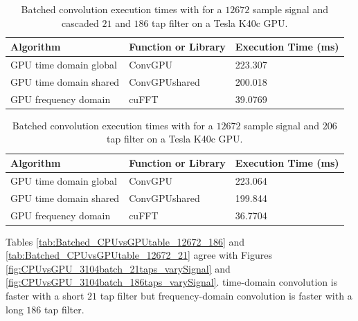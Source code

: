 \begin{table}
\caption{Batched convolution execution times with for a $12672$ sample signal and cascaded $21$ and $186$ tap filter on a Tesla K40c GPU.}
\begin{center}
\begin{tabular}{lll}
	\toprule
	Algorithm 				& Function or Library		& Execution Time (ms) \\ \midrule
	GPU time domain global 	& ConvGPU 					& 223.307		\\
	GPU time domain shared 	& ConvGPUshared 			& 200.018		\\
	GPU frequency domain 	& cuFFT						& 39.0769		\\ 
	\bottomrule
\end{tabular}
\end{center}
\label{tab:Batched_CPUvsGPUtable_12672_21_186}
\end{table}
\begin{table}
\caption{Batched convolution execution times with for a $12672$ sample signal and $206$ tap filter on a Tesla K40c GPU.}
\begin{center}
\begin{tabular}{lll}
	\toprule
	Algorithm 				& Function or Library		& Execution Time (ms) \\ \midrule
	GPU time domain global 	& ConvGPU 					& 223.064		\\
	GPU time domain shared 	& ConvGPUshared 			& 199.844		\\
	GPU frequency domain 	& cuFFT						& 36.7704		\\ 
	\bottomrule
\end{tabular}
\end{center}
\label{tab:Batched_CPUvsGPUtable_12672_206}
\end{table}

Tables \ref{tab:Batched_CPUvsGPUtable_12672_186} and \ref{tab:Batched_CPUvsGPUtable_12672_21} agree with Figures \ref{fig:CPUvsGPU_3104batch_21taps_varySignal} and \ref{fig:CPUvsGPU_3104batch_186taps_varySignal}.
time-domain convolution is faster with a short $21$ tap filter but frequency-domain convolution is faster with a long $186$ tap filter.

